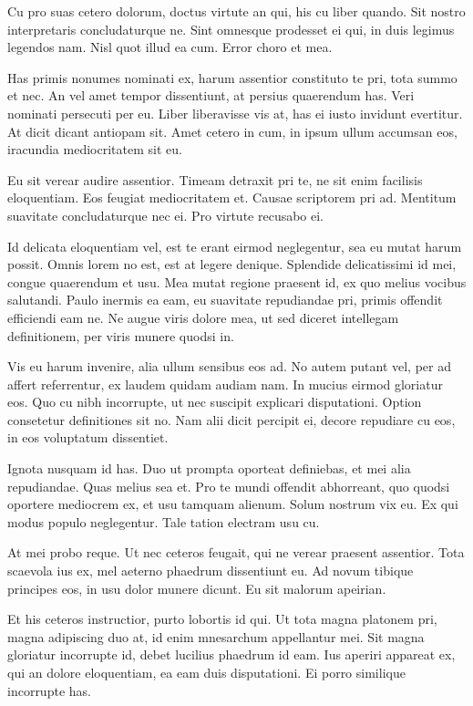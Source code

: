 \documentclass[
	12pt,				%
	openright,			%
	oneside,			%
	a4paper,			%
	english,			%
	french,				%
	spanish,			%
	brazil,				%
	]{abntex2}
\begin{document}
Cu pro suas cetero dolorum, doctus virtute an qui, his cu liber quando. Sit nostro interpretaris concludaturque ne. Sint omnesque prodesset ei qui, in duis legimus legendos nam. Nisl quot illud ea cum. Error choro et mea.

Has primis nonumes nominati ex, harum assentior constituto te pri, tota summo et nec. An vel amet tempor dissentiunt, at persius quaerendum has. Veri nominati persecuti per eu. Liber liberavisse vis at, has ei iusto invidunt evertitur. At dicit dicant antiopam sit. Amet cetero in cum, in ipsum ullum accumsan eos, iracundia mediocritatem sit eu.

Eu sit verear audire assentior. Timeam detraxit pri te, ne sit enim facilisis eloquentiam. Eos feugiat mediocritatem et. Causae scriptorem pri ad. Mentitum suavitate concludaturque nec ei. Pro virtute recusabo ei.

Id delicata eloquentiam vel, est te erant eirmod neglegentur, sea eu mutat harum possit. Omnis lorem no est, est at legere denique. Splendide delicatissimi id mei, congue quaerendum et usu. Mea mutat regione praesent id, ex quo melius vocibus salutandi. Paulo inermis ea eam, eu suavitate repudiandae pri, primis offendit efficiendi eam ne. Ne augue viris dolore mea, ut sed diceret intellegam definitionem, per viris munere quodsi in.

Vis eu harum invenire, alia ullum sensibus eos ad. No autem putant vel, per ad affert referrentur, ex laudem quidam audiam nam. In mucius eirmod gloriatur eos. Quo cu nibh incorrupte, ut nec suscipit explicari disputationi. Option consetetur definitiones sit no. Nam alii dicit percipit ei, decore repudiare cu eos, in eos voluptatum dissentiet.

Ignota nusquam id has. Duo ut prompta oporteat definiebas, et mei alia repudiandae. Quas melius sea et. Pro te mundi offendit abhorreant, quo quodsi oportere mediocrem ex, et usu tamquam alienum. Solum nostrum vix eu. Ex qui modus populo neglegentur. Tale tation electram usu cu.

At mei probo reque. Ut nec ceteros feugait, qui ne verear praesent assentior. Tota scaevola ius ex, mel aeterno phaedrum dissentiunt eu. Ad novum tibique principes eos, in usu dolor munere dicunt. Eu sit malorum apeirian.

Et his ceteros instructior, purto lobortis id qui. Ut tota magna platonem pri, magna adipiscing duo at, id enim mnesarchum appellantur mei. Sit magna gloriatur incorrupte id, debet lucilius phaedrum id eam. Ius aperiri appareat ex, qui an dolore eloquentiam, ea eam duis disputationi. Ei porro similique incorrupte has.
\end{document}
